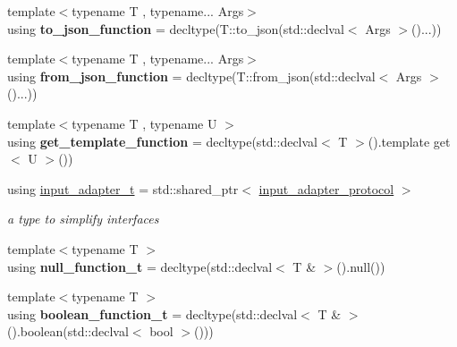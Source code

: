 \begin{DoxyCompactItemize}
{\footnotesize template$<$typename T , typename... Args$>$ }\\using {\bfseries to\+\_\+json\+\_\+function} = decltype(T\+::to\+\_\+json(std\+::declval$<$ Args $>$()...))
\item 
\mbox{\label{namespacenlohmann_1_1detail_a1711ee5cef66a0523055c8d9f024f322}} 
{\footnotesize template$<$typename T , typename... Args$>$ }\\using {\bfseries from\+\_\+json\+\_\+function} = decltype(T\+::from\+\_\+json(std\+::declval$<$ Args $>$()...))
\item 
\mbox{\label{namespacenlohmann_1_1detail_ab4d22cdb6521ee3508db496dea66711e}} 
{\footnotesize template$<$typename T , typename U $>$ }\\using {\bfseries get\+\_\+template\+\_\+function} = decltype(std\+::declval$<$ T $>$().template get$<$ U $>$())
\item 
\mbox{\label{namespacenlohmann_1_1detail_ae132f8cd5bb24c5e9b40ad0eafedf1c2}} 
using \hyperlink{namespacenlohmann_1_1detail_ae132f8cd5bb24c5e9b40ad0eafedf1c2}{input\+\_\+adapter\+\_\+t} = std\+::shared\+\_\+ptr$<$ \hyperlink{structnlohmann_1_1detail_1_1input__adapter__protocol}{input\+\_\+adapter\+\_\+protocol} $>$
\begin{DoxyCompactList}\small\item\em a type to simplify interfaces \end{DoxyCompactList}\item 
\mbox{\label{namespacenlohmann_1_1detail_ac1b4e524746bf8b790b2b776048b93c4}} 
{\footnotesize template$<$typename T $>$ }\\using {\bfseries null\+\_\+function\+\_\+t} = decltype(std\+::declval$<$ T \& $>$().null())
\item 
\mbox{\label{namespacenlohmann_1_1detail_a45ec87326503b8884b664a9ef23a6c99}} 
{\footnotesize template$<$typename T $>$ }\\using {\bfseries boolean\+\_\+function\+\_\+t} = decltype(std\+::declval$<$ T \& $>$().boolean(std\+::declval$<$ bool $>$()))
\item 
\mbox{\label{namespacenlohmann_1_1detail_a4a3e14a011b9ea1ff849fc6d2411e6a0}} 

\end{DoxyCompactItemize}
